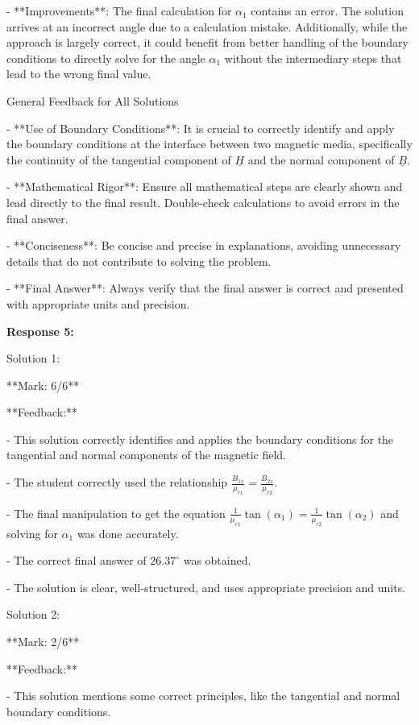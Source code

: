 \documentclass[a4paper,11pt]{article}
\begin{document}
- **Improvements**: The final calculation for \(\alpha_1\) contains an error. The solution arrives at an incorrect angle due to a calculation mistake. Additionally, while the approach is largely correct, it could benefit from better handling of the boundary conditions to directly solve for the angle \(\alpha_1\) without the intermediary steps that lead to the wrong final value.

General Feedback for All Solutions

- **Use of Boundary Conditions**: It is crucial to correctly identify and apply the boundary conditions at the interface between two magnetic media, specifically the continuity of the tangential component of \( \underline{H} \) and the normal component of \( \underline{B} \).

- **Mathematical Rigor**: Ensure all mathematical steps are clearly shown and lead directly to the final result. Double-check calculations to avoid errors in the final answer.

- **Conciseness**: Be concise and precise in explanations, avoiding unnecessary details that do not contribute to solving the problem.

- **Final Answer**: Always verify that the final answer is correct and presented with appropriate units and precision.

\bigskip
\textbf{Response 5:}

Solution 1:

**Mark: 6/6**

**Feedback:**

- This solution correctly identifies and applies the boundary conditions for the tangential and normal components of the magnetic field.

- The student correctly used the relationship \( \frac{B_{1x}}{\mu_{r1}} = \frac{B_{2x}}{\mu_{r2}} \).

- The final manipulation to get the equation \( \frac{1}{\mu_{r1}} \tan(\alpha_1) = \frac{1}{\mu_{r2}} \tan(\alpha_2) \) and solving for \( \alpha_1 \) was done accurately.

- The correct final answer of \( 26.37^\circ \) was obtained.

- The solution is clear, well-structured, and uses appropriate precision and units.

Solution 2:

**Mark: 2/6**

**Feedback:**

- This solution mentions some correct principles, like the tangential and normal boundary conditions.
\end{document}
